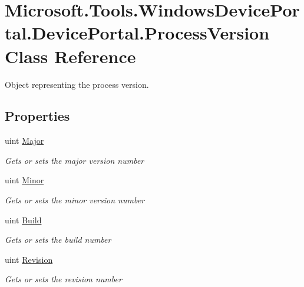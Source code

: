 \hypertarget{class_microsoft_1_1_tools_1_1_windows_device_portal_1_1_device_portal_1_1_process_version}{}\section{Microsoft.\+Tools.\+Windows\+Device\+Portal.\+Device\+Portal.\+Process\+Version Class Reference}
\label{class_microsoft_1_1_tools_1_1_windows_device_portal_1_1_device_portal_1_1_process_version}


Object representing the process version.  


\subsection*{Properties}
\begin{DoxyCompactItemize}
\item 
uint \hyperlink{class_microsoft_1_1_tools_1_1_windows_device_portal_1_1_device_portal_1_1_process_version_a0819c10fc88cfb37cb60079ab85a7a06}{Major}
\begin{DoxyCompactList}\small\item\em Gets or sets the major version number \end{DoxyCompactList}\item 
uint \hyperlink{class_microsoft_1_1_tools_1_1_windows_device_portal_1_1_device_portal_1_1_process_version_a155ceb8148677ec286501bcc4e129188}{Minor}
\begin{DoxyCompactList}\small\item\em Gets or sets the minor version number \end{DoxyCompactList}\item 
uint \hyperlink{class_microsoft_1_1_tools_1_1_windows_device_portal_1_1_device_portal_1_1_process_version_af230e31bf6feaba73184c9a9b9154144}{Build}
\begin{DoxyCompactList}\small\item\em Gets or sets the build number \end{DoxyCompactList}\item 
uint \hyperlink{class_microsoft_1_1_tools_1_1_windows_device_portal_1_1_device_portal_1_1_process_version_ab666b05e801c9c312bf09c06dff90fdc}{Revision}
\begin{DoxyCompactList}\small\item\em Gets or sets the revision number \end{DoxyCompactList}\end{DoxyCompactItemize}


